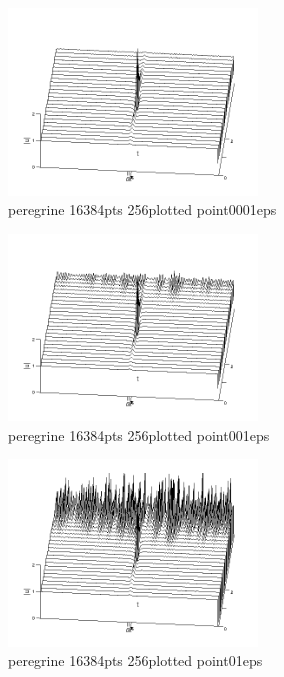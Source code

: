 \documentclass{beamer}
\theoremstyle{plain}
\theoremstyle{definition}
\begin{document}
\frame
{
\begin{figure}
\begin{center}
\includegraphics[width=250px]{peregrine_16384pts_256plotted_point0001eps.png}\\
peregrine 16384pts 256plotted point0001eps
\end{center}
\end{figure}
}

\frame
{
\begin{figure}
\begin{center}
\includegraphics[width=250px]{peregrine_16384pts_256plotted_point001eps.png}\\
peregrine 16384pts 256plotted point001eps
\end{center}
\end{figure}
}

\frame
{
\begin{figure}
\begin{center}
\includegraphics[width=250px]{peregrine_16384pts_256plotted_point01eps.png}\\
peregrine 16384pts 256plotted point01eps
\end{center}
\end{figure}
}
\end{document}
